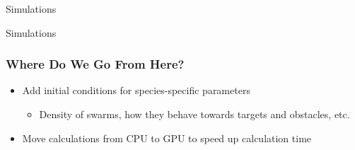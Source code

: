 \documentclass[xcolor=dvipsnames]{beamer}
\begin{document}
\begin{frame}{Simulations}
	\begin{center}
	\end{center}
\end{frame}

\begin{frame}{Simulations}
	\begin{center}
	\end{center}
\end{frame}

\begin{frame}
	\frametitle{Where Do We Go From Here?}
	\begin{itemize}
		\item Add initial conditions for species-specific parameters 
			\begin{itemize}
				\item Density of swarms, how they behave towards targets and obstacles, etc.
			\end{itemize}
		\item Move calculations from CPU to GPU to speed up calculation time
	\end{itemize}
\end{frame}
\end{document}
